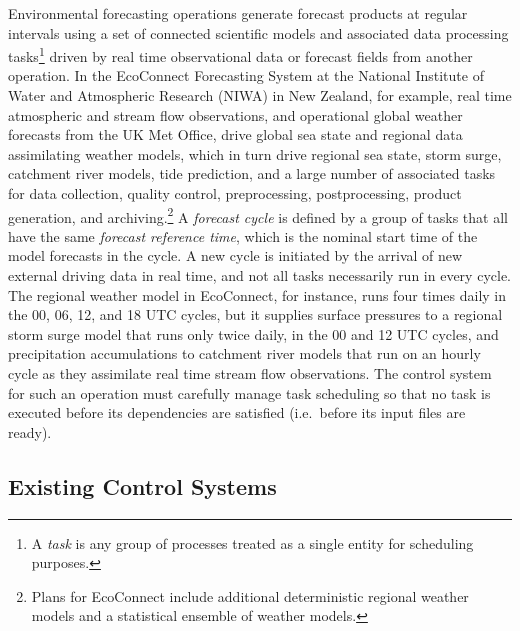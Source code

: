 \documentclass[11pt,a4paper]{article}
\begin{document}
Environmental forecasting operations generate forecast products at
regular intervals using a set of connected scientific models and
associated data processing tasks\footnote{A {\em task} is any group of
processes treated as a single entity for scheduling purposes.} driven by
real time observational data or forecast fields from another operation.
In the EcoConnect Forecasting System at the National Institute of Water
and Atmospheric Research (NIWA) in New Zealand, for example, real time
atmospheric and stream flow observations, and operational global weather
forecasts from the UK Met Office, drive global sea state and regional
data assimilating weather models, which in turn drive regional sea
state, storm surge, catchment river models, tide prediction, and a large
number of associated tasks for data collection, quality control,
preprocessing, postprocessing, product generation, and
archiving.\footnote{Plans for EcoConnect include additional
deterministic regional weather models and a statistical ensemble of
weather models.} A {\em forecast cycle} is defined by a group of tasks
that all have the same {\em forecast reference time}, which is the
nominal start time of the model forecasts in the cycle.  A new cycle is
initiated by the arrival of new external driving data in real time, and
not all tasks necessarily run in every cycle. The regional weather model
in EcoConnect, for instance, runs four times daily in the 00, 06, 12,
and 18 UTC cycles, but it supplies surface pressures to a regional storm
surge model that runs only twice daily, in the 00 and 12 UTC cycles, and
precipitation accumulations to catchment river models that run on an
hourly cycle as they assimilate real time stream flow observations.  The
control system for such an operation must carefully manage task
scheduling so that no task is executed before its dependencies are
satisfied (i.e.\ before its input files are ready).  

\subsection{Existing Control Systems}
\end{document}
